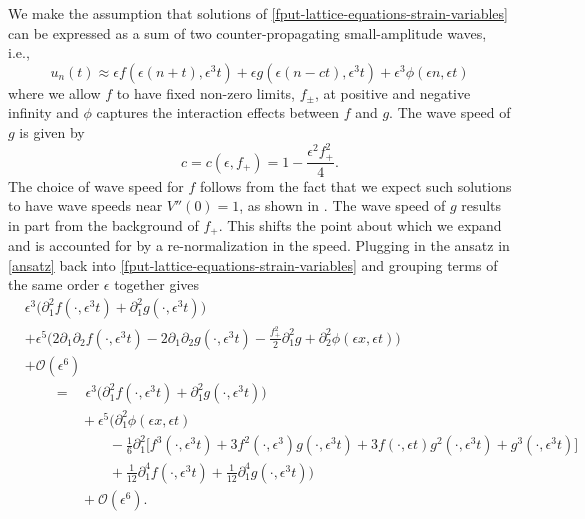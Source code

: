 \documentclass[oneside,reqno]{amsart}
\begin{document}
We make the assumption that solutions of \cref{fput-lattice-equations-strain-variables} can be expressed as a sum of two counter-propagating small-amplitude waves, i.e., 
\begin{equation}\label{ansatz}
	u_n(t) \approx \epsilon f(\epsilon(n+t), \epsilon^3t) + \epsilon g(\epsilon(n-ct), \epsilon^3 t) + \epsilon^3\phi(\epsilon n, \epsilon t)
\end{equation}
where we allow \(f\) to have fixed non-zero limits, \(f_\pm\), at positive and negative infinity and \(\phi\) captures the interaction effects between \(f\) and \(g\). The wave speed of \(g\) is given by
\begin{equation}\label{ansatz-wave-speed}
	c = c(\epsilon, f_+) = 1 - \frac{\epsilon^2 f_+^2}{4}.
\end{equation}
The choice of wave speed for \(f\) follows from the fact that we expect such solutions to have wave speeds near  \(V''(0) = 1\), as shown in \cites{iooss2000travelling,norton2023kinklike}. The wave speed of \(g\) results in part from the background of \(f_+\). This shifts the point about which we expand and is accounted for by a re-normalization in the speed. Plugging in the ansatz in \cref{ansatz} back into \cref{fput-lattice-equations-strain-variables} and grouping terms of the same order \(\epsilon\) together gives
\begin{equation*}
	\begin{aligned}
		&\epsilon^3 \Big(\partial_1^2 f(\cdot, \epsilon^3 t) + \partial_1^2 g(\cdot, \epsilon^3 t)\Big) \\
		&+ \epsilon^5 \Big( 2 \partial_1\partial_2 f(\cdot, \epsilon^3t) - 2 \partial_1\partial_2 g(\cdot, \epsilon^3 t) - \frac{f_+^2} 2 \partial_1^2 g + \partial_2^2 \phi(\epsilon x, \epsilon t)\Big) \\
		&+ \mathcal O(\epsilon^6)\\
		&\qquad = \quad \epsilon^3 \Big(\partial_1^2 f(\cdot, \epsilon^3 t) + \partial_1^2 g(\cdot, \epsilon^3 t)\Big) \\
		&\qquad\qquad + \epsilon^5\Big(\partial_1^2  \phi(\epsilon x, \epsilon t) \\
		&\qquad\qquad\qquad - \frac 1 6 \partial_1^2 \big[f^3(\cdot, \epsilon^3 t ) + 3 f^2(\cdot,\epsilon^3)g(\cdot, \epsilon^3t) + 3 f(\cdot, \epsilon t) g^2(\cdot,\epsilon^3 t) + g^3(\cdot, \epsilon^3 t)\big] \\
		&\qquad\qquad\qquad+ \frac 1 {12} \partial_1^4 f(\cdot, \epsilon^3 t) + \frac 1 {12} \partial_1^4 g(\cdot, \epsilon^3 t)\Big) \\
		&\qquad\qquad+ \mathcal O(\epsilon^6).
	\end{aligned}
\end{equation*}
\end{document}
